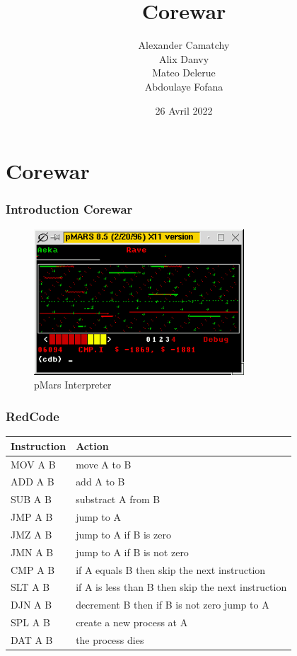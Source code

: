 \documentclass{beamer}
\title{Corewar}
\date{26 Avril 2022}
\author{Alexander Camatchy \\ Alix Danvy \\ Mateo Delerue \\ Abdoulaye Fofana}
\institute{Université de Caen Normandie}
\begin{document}
\maketitle 

\begin{frame}
\tableofcontents
\end{frame}

\section{Corewar}
\begin{frame}
\frametitle{Introduction Corewar}
\begin{figure}
	\centering
	\includegraphics[width=0.7\textwidth]{images/PMars.png}
	\caption{pMars Interpreter}
\end{figure}
\end{frame}

\begin{frame}
	\frametitle{RedCode}
	\begin{table}[h!]
		\begin{center}
			\begin{tabular}{l|l}
				\textbf{Instruction} & \textbf{Action} \\
				\hline
				MOV A B & move A to B\\
				ADD A B & add A to B \\
				SUB A B & substract A from B\\
				JMP A B & jump to A\\
				JMZ A B & jump to A if B is zero\\
				JMN A B & jump to A if B is not zero\\
				CMP A B & if A equals B then skip the next instruction\\
				SLT A B & if A is less than B then skip the next instruction\\
				DJN A B & decrement B then if B is not zero jump to A\\
				SPL A B & create a new process at A\\
				DAT A B & the process dies\\
			\end{tabular}
		\end{center}
	\end{table}
\end{frame}
\end{document}
